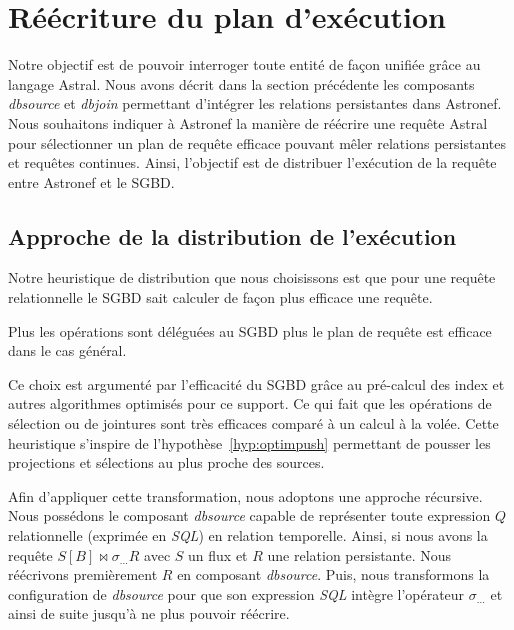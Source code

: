 \section{Réécriture du plan d'exécution}\label{sec:contrib:asteroid:reecriture}
Notre objectif est de pouvoir interroger toute entité de façon unifiée grâce au langage Astral. Nous avons décrit dans la section précédente les composants \textit{dbsource} et \textit{dbjoin} permettant d'intégrer les relations persistantes dans Astronef. Nous souhaitons indiquer à Astronef la manière de réécrire une requête Astral pour sélectionner un plan de requête efficace pouvant mêler relations persistantes et requêtes continues. Ainsi, l'objectif est de distribuer l'exécution de la requête entre Astronef et le SGBD.

\subsection{Approche de la distribution de l'exécution}
Notre heuristique de distribution que nous choisissons est que pour une requête relationnelle le SGBD sait calculer de façon plus efficace une requête.

\begin{hyp}\label{hyp:sgbd}
    Plus les opérations sont déléguées au SGBD plus le plan de requête est efficace dans le cas général.
\end{hyp}

Ce choix est argumenté par l'efficacité du SGBD grâce au pré-calcul des index et autres algorithmes optimisés pour ce support. Ce qui fait que les opérations de sélection ou de jointures sont très efficaces comparé à un calcul à la volée. Cette heuristique s'inspire de l'hypothèse~\ref{hyp:optimpush} permettant de pousser les projections et sélections au plus proche des sources.

Afin d'appliquer cette transformation, nous adoptons une approche récursive. Nous possédons le composant \textit{dbsource} capable de représenter toute expression $Q$ relationnelle (exprimée en \textit{SQL}) en relation temporelle. Ainsi, si nous avons la requête $S[B] \Join \sigma_{...} R$ avec $S$ un flux et $R$ une relation persistante. Nous réécrivons premièrement $R$ en composant \textit{dbsource}. Puis, nous transformons la configuration de \textit{dbsource} pour que son expression \textit{SQL} intègre l'opérateur $\sigma_{...}$ et ainsi de suite jusqu'à ne plus pouvoir réécrire.

